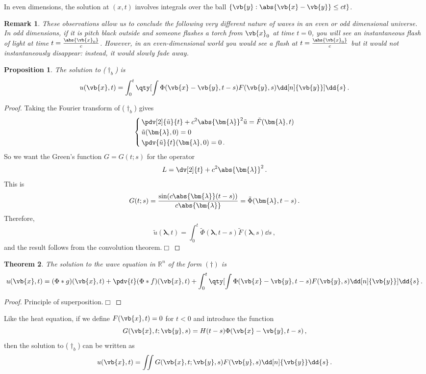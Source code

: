\documentclass{article}
\theoremstyle{plain}\theoremheaderfont{\normalfont\itshape}\theorembodyfont{\rmfamily}\theoremseparator{.}\newtheorem*{rem}{Remark}\newtheorem*{ex}{Example}\newtheorem*{proof}{Proof}\newtheorem*{altp}{Alternative proof}
\theoremstyle{plain}\theoremheaderfont{\normalfont\bfseries}\theorembodyfont{\rmfamily}\theoremseparator{.}\newtheorem{thm}{Theorem}[section]\newtheorem{lem}[thm]{Lemma}\newtheorem{prop}[thm]{Proposition}\newtheorem*{cor}{Corollary}\newtheorem{defn}[thm]{Definition}\newtheorem{clm}[thm]{Claim}\newtheorem{clminproof}{Claim}
\theoremstyle{break}\theoremheaderfont{\normalfont\itshape}\theorembodyfont{\rmfamily}\theoremseparator{.\medskip}\newtheorem*{proofskip}{Proof}\newtheorem*{exs}{Examples}\newtheorem*{rems}{Remarks}
\theoremstyle{break}\theoremheaderfont{\normalfont\bfseries}\theorembodyfont{\rmfamily}\theoremseparator{.\medskip}\newtheorem{lemskip}[thm]{Lemma}\newtheorem{defnskip}[thm]{Definition}\newtheorem{propskip}[thm]{Proposition}\newtheorem{thmskip}[thm]{Theorem}
\numberwithin{equation}{section}
\newcommand{\qed}{\hfill\ensuremath{\Box}}
\newcommand{\bl}{\bm{\lambda}}
\begin{document}
	In even dimensions, the solution at \((x, t)\) involves integrals over the ball \(\{\vb{y}:\abs{\vb{x}-\vb{y}}\le ct\}\).

	\begin{rem}
		These observations allow us to conclude the following very different nature of waves in an even or odd dimensional universe. In odd dimensions, if it is pitch black outside and someone flashes a torch from \(\vb{x}_0\) at time \(t=0\), you will see an instantaneous flash of light at time \(t=\frac{\abs{\vb{x}_0}}{c}\). However, in an even-dimensional world you would see a flash at \(t=\frac{\abs{\vb{x}_0}}{c}\) but it would not instantaneously disappear: instead, it would slowly fade away.
	\end{rem}
	\begin{prop}
		The solution to (\(\dagger_b\)) is
		\[u(\vb{x},t)=\int_{0}^{t}\qty[\int\Phi(\vb{x}-\vb{y},t-s)F(\vb{y},s)\dd[n]{\vb{y}}]\dd{s}\,.\]
	\end{prop}
	\begin{proof}
		Taking the Fourier transform of (\(\dagger_b\)) gives
		\[\left\{\begin{aligned}
			&\,\pdv[2]{\tilde{u}}{t}+c^2\abs{\bl}^2\tilde{u}=\tilde{F}(\bl,t)\\
			&\,\tilde{u}(\bl,0)=0\\
			&\,\pdv{\tilde{u}}{t}(\bl,0)=0\,.
		\end{aligned}\right.\]
		So we want the Green's function \(G=G(t;s)\) for the operator
		\[L=\dv[2]{t}+c^2\abs{\bl}^2\,.\]
		This is
		\[G(t;s)=\frac{\sin(c\abs{\bl}(t-s))}{c\abs{\bl}}=\tilde{\Phi}(\bl,t-s)\,.\]
		Therefore,
		\[\tilde{u}(\bl,t)=\int_{0}^{t}\tilde{\Phi}(\bl,t-s)\tilde{F}(\bl,s)\dd{s}\,,\]
		and the result follows from the convolution theorem.\qed
	\end{proof}

	\begin{thm}
		The solution to the wave equation in \(\mathbb{R}^n\) of the form \((\dagger)\) is
		\[u(\vb{x},t)=(\Phi*g)(\vb{x},t)+\pdv{t}(\Phi*f)(\vb{x},t)+\int_{0}^{t}\qty[\int\Phi(\vb{x}-\vb{y},t-s)F(\vb{y},s)\dd[n]{\vb{y}}]\dd{s}\,.\]
	\end{thm}
	\begin{proof}
		Principle of superposition.\qed
	\end{proof}

	Like the heat equation, if we define \(F(\vb{x},t)=0\) for \(t<0\) and introduce the function
	\[G(\vb{x},t;\vb{y},s)=H(t-s)\Phi(\vb{x}-\vb{y},t-s)\,,\]
	then the solution to (\(\dagger_b\)) can be written as
	\[u(\vb{x},t)=\iint G(\vb{x},t;\vb{y},s)F(\vb{y},s)\dd[n]{\vb{y}}\dd{s}\,.\]
\end{document}
